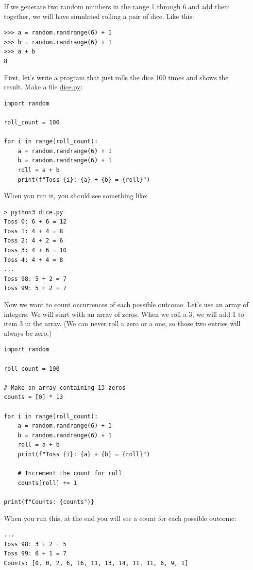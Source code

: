 If we generate two random numbers in the range 1 through 6 and add them together, we
will have simulated rolling a pair of dice. Like this:

\begin{verbatim}
>>> a = random.randrange(6) + 1
>>> b = random.randrange(6) + 1
>>> a + b
8
\end{verbatim}

First, let's write a program that just rolls the dice 100 times and shows the result. Make a file \url{dice.py}:
\begin{verbatim}
import random

roll_count = 100

for i in range(roll_count):
    a = random.randrange(6) + 1
    b = random.randrange(6) + 1
    roll = a + b
    print(f"Toss {i}: {a} + {b} = {roll}")
\end{verbatim}

When you run it, you should see something like:
\begin{verbatim}
> python3 dice.py
Toss 0: 6 + 6 = 12
Toss 1: 4 + 4 = 8
Toss 2: 4 + 2 = 6
Toss 3: 4 + 6 = 10
Toss 4: 4 + 4 = 8
...
Toss 98: 5 + 2 = 7
Toss 99: 5 + 2 = 7
\end{verbatim}

Now we want to count occurrences of each possible outcome. Let's use an
array of integers. We will start with an array of zeros. When we roll a 3, we will add 1 to item 3 in the array. (We can
never roll a zero or a one, so those two entries will always be zero.)
\begin{verbatim}
import random

roll_count = 100

# Make an array containing 13 zeros
counts = [0] * 13

for i in range(roll_count):
    a = random.randrange(6) + 1
    b = random.randrange(6) + 1
    roll = a + b
    print(f"Toss {i}: {a} + {b} = {roll}")

    # Increment the count for roll
    counts[roll] += 1

print(f"Counts: {counts")}
\end{verbatim}

When you run this, at the end you will see a count for each possible outcome:

\begin{verbatim}
...
Toss 98: 3 + 2 = 5
Toss 99: 6 + 1 = 7
Counts: [0, 0, 2, 6, 16, 11, 13, 14, 11, 11, 6, 9, 1]
\end{verbatim}

